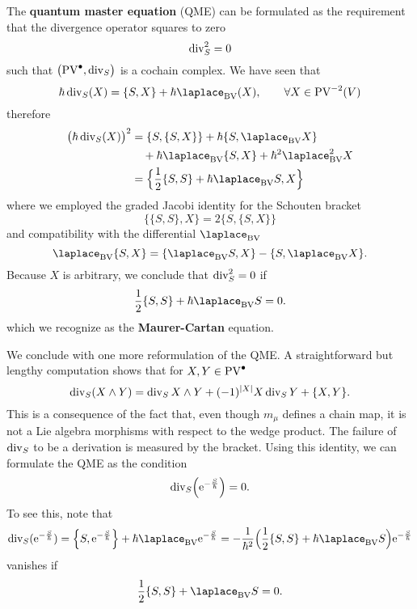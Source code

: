 The \textbf{quantum master equation} (QME) can be formulated as the requirement that the divergence operator squares to zero
\begin{equation*}
  \operatorname{div}_S^2 = 0
\end{equation*}
such that $ \bigl(\operatorname{PV}^{\bullet}, \operatorname{div}_S\bigr)$ is a cochain complex.
We have seen that
\begin{equation*}
  \hbar \divergence_S (X)
  = \{ S, X  \} + \hbar \bv (X ),
  \qquad \forall X \in \PV^{-2}(V)
\end{equation*}
therefore
\begin{align*}
  \bigl( \hbar \divergence_S (X) \bigr)^2
    &= \{ S, \{ S, X  \} \}
    + \hbar \{ S, \bv X \} \\
    & \quad + \hbar \bv \{ S, X  \}
    + \hbar^2 \bv^2 X \\
    &= \Bigl\{ \frac{1}{2} \{S, S \} + \hbar \bv S, X  \Bigr\}
\end{align*}
where we employed the graded Jacobi identity for the Schouten bracket
\begin{equation*}
  \{ \{ S, S \}, X  \}
  = 2\{ S, \{ S, X  \} \} 
\end{equation*}
and compatibility with the differential $\bv$
\begin{equation*}
  \bv \{ S, X  \} =
  \{ \bv S, X \} - \{ S, \bv X \}.
\end{equation*}
Because $X$ is arbitrary, we conclude that $\operatorname{div}_S^2 = 0$ if
\begin{equation*}
  \frac{1}{2} \{S, S\} + \hbar \bv S = 0.
\end{equation*}
which we recognize as the \textbf{Maurer-Cartan} equation.

We conclude with one more reformulation of the QME. A straightforward but lengthy computation shows that for $X, Y \in \operatorname{PV}^{\bullet}$
\begin{equation*}
  \operatorname{div}_S (X \wedge Y)
  = \operatorname{div}_S X \wedge Y + (-1)^{|X|} X \operatorname{div}_S Y
  + \{ X, Y \}.
\end{equation*}
This is a consequence of the fact that, even though $m_\mu$ defines a chain map, it is not a Lie algebra morphisms with respect to the wedge product.
The failure of $\operatorname{div}_S$ to be a derivation is measured by the bracket.
Using this identity, we can formulate the QME as the condition
\begin{equation*}
  \operatorname{div}_S \Bigl( \mathrm{e}^{- \frac{S}{\hbar} } \Bigr) = 0.
\end{equation*}
To see this, note that
\begin{equation*}
  \divergence_S ( \euler^{-\frac{S}{\hbar}} )
  = \Bigl\{ S, \euler^{-\frac{S}{\hbar}} \Bigr\} + \hbar \bv \euler^{-\frac{S}{\hbar}}
  = - \frac{1}{\hbar^2} \Bigl(
  \frac{1}{2} \{ S, S \} + \hbar \bv S \Bigr) \euler^{-\frac{S}{\hbar}}
\end{equation*}
vanishes if
\begin{equation*}
  \frac{1}{2} \{ S, S \} + \bv S = 0.
\end{equation*}
